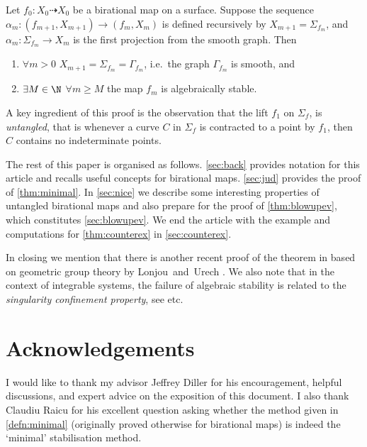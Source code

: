 \documentclass[11pt, final]{amsart}
\newcommand{\dashto}{\dashrightarrow}
\newcommand{\sgraph}{\Sigma}
\newcommand{\nice}{untangled}
\begin{document}
\begin{thm}\label{thm:blowupev}
  Let $f_0 : X_0 \dashto X_0$ be a birational map on a surface.
Suppose the sequence $\alpha_m : (f_{m+1}, X_{m+1}) \to (f_m, X_m)$ is defined recursively by $X_{m+1} = \sgraph_{\!f_m}$, and $\alpha_m : \sgraph_{\!f_m} \to X_m$ is the first projection from the smooth graph. Then
\begin{enumerate}
 \item $\forall m > 0$ $X_{m+1} = \sgraph_{\!f_m} = \Gamma_{\!f_m}$, i.e.\ the graph $\Gamma_{\!f_m}$ is smooth, and
 \item $\exists M \in \N$ $\forall m \ge M$ the map $f_m$ is algebraically stable.
\end{enumerate}
\end{thm}

A key ingredient of this proof is the observation that the lift $f_1$ on $\sgraph_{\!f}$, is \emph{\nice{}}, that is whenever a curve $C$ in $\sgraph_{\!f}$ is contracted to a point by $f_1$, then $C$ contains no indeterminate points.

The rest of this paper is organised as follows. \autoref{sec:back} provides notation for this article and recalls useful concepts for birational maps. \autoref{sec:jud} provides the proof of \autoref{thm:minimal}. In \autoref{sec:nice} we describe some interesting properties of \nice{} birational maps and also prepare for the proof of \autoref{thm:blowupev}, which constitutes \autoref{sec:blowupev}. We end the article with the example and computations for \autoref{thm:counterex} in \autoref{sec:counterex}.

In closing we mention that there is another recent proof of the theorem in \cite{DF} based on geometric group theory by Lonjou~and~Urech \cite{LU}. We also note that in the context of integrable systems, the failure of algebraic stability is related to the \emph{singularity confinement property}, see \cite{GRP} etc.

\section*{Acknowledgements}

I would like to thank my advisor Jeffrey Diller for his encouragement, helpful discussions, and expert advice on the exposition of this document. I also thank Claudiu Raicu for his excellent question asking whether the method given in \autoref{defn:minimal} (originally proved otherwise for birational maps) is indeed the `minimal' stabilisation method.
\end{document}
